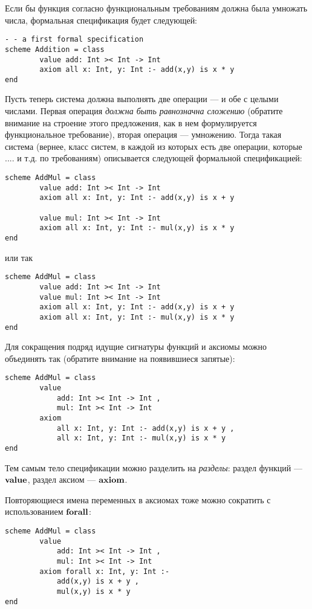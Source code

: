 \documentclass[14pt]{extreport}
\begin{document}
Если бы функция согласно функциональным требованиям должна была умножать числа, формальная спецификация будет следующей:
\begin{lstlisting}
- - a first formal specification
scheme Addition = class
        value add: Int >< Int -> Int
        axiom all x: Int, y: Int :- add(x,y) is x * y
end
\end{lstlisting}

Пусть теперь система должна выполнять две операции --- и обе с целыми числами. Первая операция \emph{должна быть равнозначна сложению} (обратите внимание на строение этого предложения, как в нем формулируется функциональное требование), вторая операция --- умножению. Тогда такая система (вернее, класс систем, в каждой из которых есть две операции, которые .... и т.д. по требованиям) описывается следующей формальной спецификацией:
\begin{lstlisting}
scheme AddMul = class
        value add: Int >< Int -> Int
        axiom all x: Int, y: Int :- add(x,y) is x + y

        value mul: Int >< Int -> Int
        axiom all x: Int, y: Int :- mul(x,y) is x * y
end
\end{lstlisting}

или так

\begin{lstlisting}
scheme AddMul = class
        value add: Int >< Int -> Int
        value mul: Int >< Int -> Int
        axiom all x: Int, y: Int :- add(x,y) is x + y
        axiom all x: Int, y: Int :- mul(x,y) is x * y
end
\end{lstlisting}

Для сокращения подряд идущие сигнатуры функций и аксиомы можно объединять так (обратите внимание на появившиеся запятые):
\begin{lstlisting}
scheme AddMul = class
        value
            add: Int >< Int -> Int ,
            mul: Int >< Int -> Int
        axiom
            all x: Int, y: Int :- add(x,y) is x + y ,
            all x: Int, y: Int :- mul(x,y) is x * y
end
\end{lstlisting}

Тем самым тело спецификации можно разделить на \emph{разделы}: раздел функций --- $\textbf{value}$, раздел аксиом --- $\mathop{\textbf{axiom}}$.

Повторяющиеся имена переменных в аксиомах тоже можно сократить с использованием $\textbf{forall}$:
\begin{lstlisting}
scheme AddMul = class
        value
            add: Int >< Int -> Int ,
            mul: Int >< Int -> Int
        axiom forall x: Int, y: Int :-
            add(x,y) is x + y ,
            mul(x,y) is x * y
end
\end{lstlisting}
\end{document}
